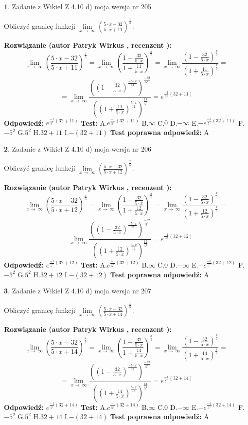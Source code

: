 \documentclass[12pt, a4paper]{article}
\theoremstyle{definition} %
\newtheorem{zad}{}
\newcommand{\zadStart}[1]{\begin{zad}#1\newline}
\newcommand{\zadStop}{\end{zad}}
\newcommand{\rozwStart}[2]{\noindent \textbf{Rozwiązanie (autor #1 , recenzent #2): }\newline}
\newcommand{\rozwStop}{\newline}
\newcommand{\odpStart}{\noindent \textbf{Odpowiedź:}\newline}
\newcommand{\odpStop}{\newline}
\newcommand{\testStart}{\noindent \textbf{Test:}\newline}
\newcommand{\testStop}{\newline}
\newcommand{\kluczStart}{\noindent \textbf{Test poprawna odpowiedź:}\newline}
\newcommand{\kluczStop}{\newline}
\begin{document}
\zadStart{Zadanie z Wikieł Z 4.10 d) moja wersja nr 205}


Obliczyć granicę funkcji  $\lim\limits_{x\to\ \infty}(\frac{5\cdot x-32}{5\cdot x+11})^{\frac{x}{5}}$.
\zadStop
\rozwStart{Patryk Wirkus}{}
$$\lim\limits_{x\to\ \infty}(\frac{5\cdot x-32}{5\cdot x+11})^{\frac{x}{5}} = \lim\limits_{x\to\ \infty}(\frac{1-\frac{32}{5\cdot x}}{1+\frac{11}{5\cdot x}})^{\frac{x}{5}}=\lim\limits_{x\to\ \infty}\frac{(1-\frac{32}{5\cdot x})^{\frac{x}{5}}}{(1+\frac{11}{5\cdot x})^{\frac{x}{5}}}=$$
$$=\lim\limits_{x\to\ \infty}\frac{((1-\frac{32}{5\cdot x})^{\frac{-5\cdot x}{32}})^{\frac{-32}{5^{2}}}}{((1+\frac{11}{5\cdot x})^{\frac{5\cdot x}{11}})^{\frac{11}{5^{2}}}}=e^{\frac{-1}{5^{2}}(32+11)}$$
\rozwStop
\odpStart
$e^{\frac{-1}{5^{2}}(32+11)}$
\odpStop
\testStart
A.$e^{\frac{-1}{5^{2}}(32+11)}$ B.$\infty$ C.$0$ D.$-\infty$ E.$-e^{\frac{-1}{5^{2}}(32+11)}$
F.$-5^{2}$ G.$5^{2}$
H.$32+11$
I.$-(32+11)$
\testStop
\kluczStart
A
\kluczStop



\zadStart{Zadanie z Wikieł Z 4.10 d) moja wersja nr 206}


Obliczyć granicę funkcji  $\lim\limits_{x\to\ \infty}(\frac{5\cdot x-32}{5\cdot x+12})^{\frac{x}{5}}$.
\zadStop
\rozwStart{Patryk Wirkus}{}
$$\lim\limits_{x\to\ \infty}(\frac{5\cdot x-32}{5\cdot x+12})^{\frac{x}{5}} = \lim\limits_{x\to\ \infty}(\frac{1-\frac{32}{5\cdot x}}{1+\frac{12}{5\cdot x}})^{\frac{x}{5}}=\lim\limits_{x\to\ \infty}\frac{(1-\frac{32}{5\cdot x})^{\frac{x}{5}}}{(1+\frac{12}{5\cdot x})^{\frac{x}{5}}}=$$
$$=\lim\limits_{x\to\ \infty}\frac{((1-\frac{32}{5\cdot x})^{\frac{-5\cdot x}{32}})^{\frac{-32}{5^{2}}}}{((1+\frac{12}{5\cdot x})^{\frac{5\cdot x}{12}})^{\frac{12}{5^{2}}}}=e^{\frac{-1}{5^{2}}(32+12)}$$
\rozwStop
\odpStart
$e^{\frac{-1}{5^{2}}(32+12)}$
\odpStop
\testStart
A.$e^{\frac{-1}{5^{2}}(32+12)}$ B.$\infty$ C.$0$ D.$-\infty$ E.$-e^{\frac{-1}{5^{2}}(32+12)}$
F.$-5^{2}$ G.$5^{2}$
H.$32+12$
I.$-(32+12)$
\testStop
\kluczStart
A
\kluczStop



\zadStart{Zadanie z Wikieł Z 4.10 d) moja wersja nr 207}


Obliczyć granicę funkcji  $\lim\limits_{x\to\ \infty}(\frac{5\cdot x-32}{5\cdot x+14})^{\frac{x}{5}}$.
\zadStop
\rozwStart{Patryk Wirkus}{}
$$\lim\limits_{x\to\ \infty}(\frac{5\cdot x-32}{5\cdot x+14})^{\frac{x}{5}} = \lim\limits_{x\to\ \infty}(\frac{1-\frac{32}{5\cdot x}}{1+\frac{14}{5\cdot x}})^{\frac{x}{5}}=\lim\limits_{x\to\ \infty}\frac{(1-\frac{32}{5\cdot x})^{\frac{x}{5}}}{(1+\frac{14}{5\cdot x})^{\frac{x}{5}}}=$$
$$=\lim\limits_{x\to\ \infty}\frac{((1-\frac{32}{5\cdot x})^{\frac{-5\cdot x}{32}})^{\frac{-32}{5^{2}}}}{((1+\frac{14}{5\cdot x})^{\frac{5\cdot x}{14}})^{\frac{14}{5^{2}}}}=e^{\frac{-1}{5^{2}}(32+14)}$$
\rozwStop
\odpStart
$e^{\frac{-1}{5^{2}}(32+14)}$
\odpStop
\testStart
A.$e^{\frac{-1}{5^{2}}(32+14)}$ B.$\infty$ C.$0$ D.$-\infty$ E.$-e^{\frac{-1}{5^{2}}(32+14)}$
F.$-5^{2}$ G.$5^{2}$
H.$32+14$
I.$-(32+14)$
\testStop
\kluczStart
A
\kluczStop
\end{document}
